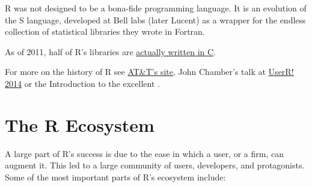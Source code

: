 \documentclass[]{book}
\theoremstyle{definition}
\theoremstyle{definition}
\theoremstyle{remark}
\begin{document}
R was not designed to be a bona-fide programming language. It is an
evolution of the S language, developed at Bell labs (later Lucent) as a
wrapper for the endless collection of statistical libraries they wrote
in Fortran.

As of 2011, half of R's libraries are
\href{https://wrathematics.github.io/2011/08/27/how-much-of-r-is-written-in-r/}{actually
written in C}.

For more on the history of R see
\href{http://www.research.att.com/articles/featured_stories/2013_09/201309_SandR.html?fbid=Yxy4qyQzmMa}{AT\&T's
site}, John Chamber's talk at
\href{https://www.youtube.com/watch?v=_hcpuRB5nGs}{UserR! 2014} or the
Introduction to the excellent \citet{venables2013modern}.

\hypertarget{ecosystem}{\section{The R Ecosystem}\label{ecosystem}}

A large part of R's success is due to the ease in which a user, or a
firm, can augment it. This led to a large community of users,
developers, and protagonists. Some of the most important parts of R's
ecosystem include:
\end{document}
